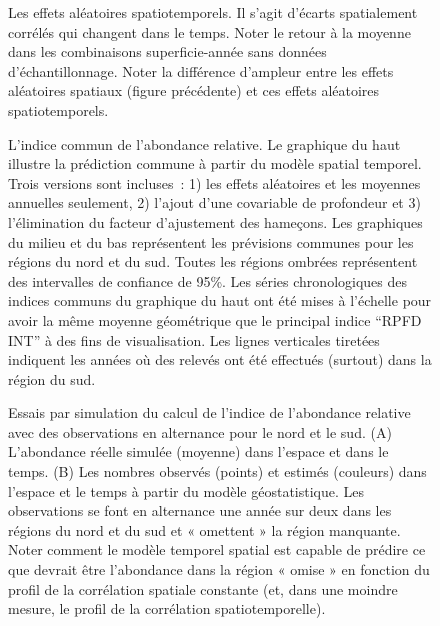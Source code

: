 \documentclass[french,11pt]{book}
\begin{document}
\begin{figure}[htb]

{\centering {} 

}

\caption{Les effets aléatoires spatiotemporels. Il s’agit d’écarts spatialement corrélés qui changent dans le temps. Noter le retour à la moyenne dans les combinaisons superficie-année sans données d’échantillonnage. Noter la différence d’ampleur entre les effets aléatoires spatiaux (figure précédente) et ces effets aléatoires spatiotemporels.}\label{fig:hbll-spatiotemporal-re}
\end{figure}
\begin{figure}[htb]

{\centering {} 

}

\caption{L’indice commun de l’abondance relative. Le graphique du haut illustre la prédiction commune à partir du modèle spatial temporel. Trois versions sont incluses~: 1) les effets aléatoires et les moyennes annuelles seulement, 2) l’ajout d’une covariable de profondeur et 3) l’élimination du facteur d’ajustement des hameçons. Les graphiques du milieu et du bas représentent les prévisions communes pour les régions du nord et du sud. Toutes les régions ombrées représentent des intervalles de confiance de 95\%. Les séries chronologiques des indices communs du graphique du haut ont été mises à l’échelle pour avoir la même moyenne géométrique que le principal indice ``RPFD INT'' à des fins de visualisation. Les lignes verticales tiretées indiquent les années où des relevés ont été effectués (surtout) dans la région du sud.}\label{fig:hbll-index}
\end{figure}
\clearpage
\begin{figure}[htb]

{\centering {} 

}

\caption{Essais par simulation du calcul de l’indice de l’abondance relative avec des observations en alternance pour le nord et le sud. (A) L’abondance réelle simulée (moyenne) dans l’espace et dans le temps. (B) Les nombres observés (points) et estimés (couleurs) dans l’espace et le temps à partir du modèle géostatistique. Les observations se font en alternance une année sur deux dans les régions du nord et du sud et « omettent » la région manquante. Noter comment le modèle temporel spatial est capable de prédire ce que devrait être l’abondance dans la région « omise » en fonction du profil de la corrélation spatiale constante (et, dans une moindre mesure, le profil de la corrélation spatiotemporelle).}\label{fig:stich-sim-pred}
\end{figure}
\end{document}
